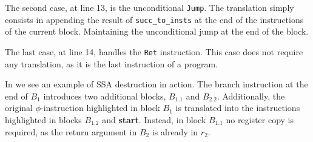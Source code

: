 The second case, at line 13, is the unconditional \texttt{Jump}. The translation simply consists in appending the result of \texttt{succ\_to\_insts} at the end of the instructions of the current block. Maintaining the unconditional jump at the end of the block.

The last case, at line 14, handles the \texttt{Ret} instruction. This case does not require any translation, as it is the last instruction of a program.



In  we see an example of SSA destruction in action. The branch instruction at the end of $B_1$ introduces two additional blocks, $B_{1.1}$ and $B_{2.2}$. Additionally, the original $\phi$-instruction highlighted in block $B_1$ is translated into the instructions highlighted in blocks $B_{1.2}$ and \textbf{start}. Instead, in block $B_{1.1}$ no register copy is required, as the return argument in $B_2$ is already in $r_2$.

